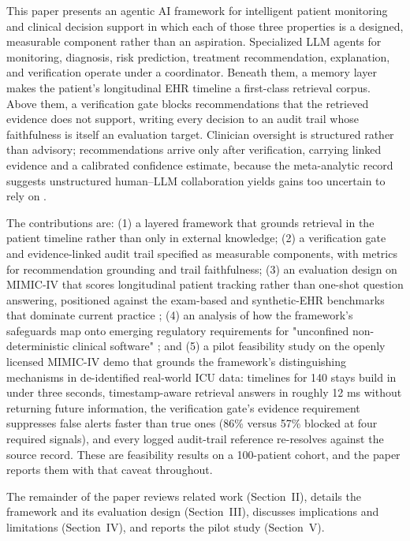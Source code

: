 This paper presents an agentic AI framework for intelligent patient monitoring and clinical
decision support in which each of those three properties is a designed, measurable component
rather than an aspiration. Specialized LLM agents for monitoring, diagnosis, risk
prediction, treatment recommendation, explanation, and verification operate under a
coordinator. Beneath them, a memory layer makes the patient's longitudinal EHR timeline a
first-class retrieval corpus. Above them, a verification gate blocks recommendations that
the retrieved evidence does not support, writing every decision to an audit trail whose
faithfulness is itself an evaluation target. Clinician oversight is structured rather than
advisory; recommendations arrive only after verification, carrying linked evidence and a
calibrated confidence estimate, because the meta-analytic record suggests unstructured human--LLM
collaboration yields gains too uncertain to rely on \cite{wang2026collaboration}.

The contributions are: (1) a layered framework that grounds retrieval in the patient
timeline rather than only in external knowledge; (2) a verification gate and evidence-linked
audit trail specified as measurable components, with metrics for recommendation grounding
and trail faithfulness; (3) an evaluation design on MIMIC-IV that scores longitudinal
patient tracking rather than one-shot question answering, positioned against the exam-based
and synthetic-EHR benchmarks that dominate current practice \cite{jiang2025medagentbench,arora2025healthbench,lovon2025mimic}; (4) an analysis of how the framework's safeguards map
onto emerging regulatory requirements for "unconfined non-deterministic clinical software"
\cite{tan2026undcs}; and (5) a pilot feasibility study on the openly licensed MIMIC-IV demo that
grounds the framework's distinguishing mechanisms in de-identified real-world ICU data: timelines for 140 stays
build in under three seconds, timestamp-aware retrieval answers in roughly 12 ms without
returning future information, the verification gate's evidence requirement suppresses false
alerts faster than true ones (86\% versus 57\% blocked at four required signals), and every
logged audit-trail reference re-resolves against the source record. These are feasibility
results on a 100-patient cohort, and the paper reports them with that caveat throughout.

The remainder of the paper reviews related work (Section~II), details the framework and its
evaluation design (Section~III), discusses implications and limitations (Section~IV), and
reports the pilot study (Section~V).


